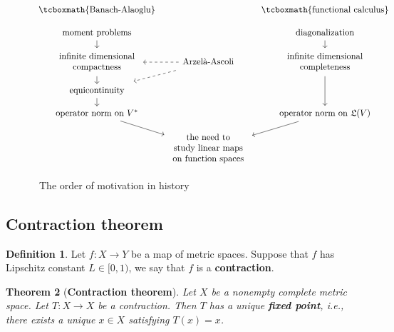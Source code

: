 \documentclass[12pt,b5paper,notitlepage]{article}
\theoremstyle{definition}
\newtheorem{df}{Definition}[section]
\theoremstyle{plain}
\newtheorem{thm}[df]{Theorem}
\newcommand{\fk}{\mathfrak}
\numberwithin{equation}{section}
\begin{document}
\begin{figure}[h]
	\centering

\begin{equation*}
\begin{tikzcd}[row sep=small,column sep=tiny]
\tcboxmath{\text{Banach-Alaoglu}} && \tcboxmath{\text{functional calculus}}\\
\text{moment problems}\arrow[d] && \text{diagonalization}\arrow[d] \\
\begin{array}{c}
\text{infinite dimensional}\\
\text{compactness}
\end{array}
\arrow[d]&
\text{Arzel\`a-Ascoli}\arrow[l,dashed,dash pattern=on 3pt off 3pt] \arrow[ld,dashed,dash pattern=on 3pt off 3pt,shorten=12]
& 
\begin{array}{c}
\text{infinite dimensional}\\
\text{completeness}
\end{array}
\arrow[dd]\\
\text{equicontinuity}
\arrow[d]& &\\
\text{operator norm on $V^*$}\arrow[dr] && \text{operator norm on $\fk L(V)$}\arrow[dl]\\
&
\begin{array}{c}
\text{the need to}\\
\text{study linear maps}\\
\text{on function spaces}
\end{array}
&
\end{tikzcd}
\end{equation*}
	\caption{~The order of motivation in history}
\label{lb572}
\end{figure}



\subsection{Contraction theorem}



\begin{df}
Let $f:X\rightarrow Y$ be a map of metric spaces. Suppose that $f$ has Lipschitz constant $L\in[0,1)$, we say that $f$ is a \textbf{contraction}.
\end{df}


\begin{thm}[\textbf{Contraction theorem}] \label{lb555}
Let $X$ be a nonempty complete metric space. Let $T:X\rightarrow X$ be a contraction. Then $T$ has a unique \textbf{fixed point},  i.e., there exists a unique $x\in X$ satisfying $T(x)=x$. 
\end{thm}
\end{document}
